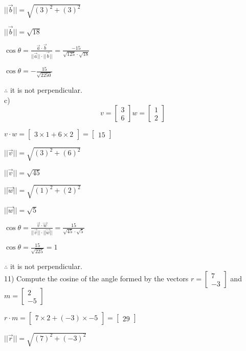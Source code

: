 \documentclass[a4paper]{article}
\begin{document}
$||\vec{b}|| = \sqrt{(3)^2+(3)^2}$

$||\vec{b}|| = \sqrt{18} $

$\cos\theta = \frac{\vec{a}\cdot\vec{b}}{||\vec{a}||\cdot||\vec{b}||} = \frac{-15}{\sqrt{125}\cdot\sqrt{18}}$

$\cos\theta = -\frac{15}{\sqrt{2250}}$

$\therefore$ it is not perpendicular.\\

c) $$v = \begin{bmatrix}
3\\
6
\end{bmatrix} w = \begin{bmatrix}
1\\
2
\end{bmatrix}$$

$v \cdot w = \begin{bmatrix}
3\times1+6\times2
\end{bmatrix} = \begin{bmatrix}
15
\end{bmatrix}$

$||\vec{v}|| = \sqrt{(3)^2+(6)^2}$

$||\vec{v}|| = \sqrt{45}$

$||\vec{w}|| = \sqrt{(1)^2 + (2)^2}$

$||\vec{w}|| = \sqrt{5}$

$\cos\theta = \frac{\vec{v}\cdot\vec{w}}{||\vec{v}||\cdot||\vec{w}||} = \frac{15}{\sqrt{45}\cdot\sqrt{5}}$

$\cos\theta = \frac{15}{\sqrt{225}} = 1$

$\therefore$ it is not perpendicular.\\

11) Compute the cosine of the angle formed by the vectors $r = \begin{bmatrix}
7\\
-3
\end{bmatrix}$ and $m = \begin{bmatrix}
2\\
-5
\end{bmatrix}$

$r \cdot m = \begin{bmatrix}
7\times2+(-3)\times-5
\end{bmatrix} = \begin{bmatrix}
29
\end{bmatrix}$

$||\vec{r}|| = \sqrt{(7)^2 + (-3)^2}$
\end{document}
